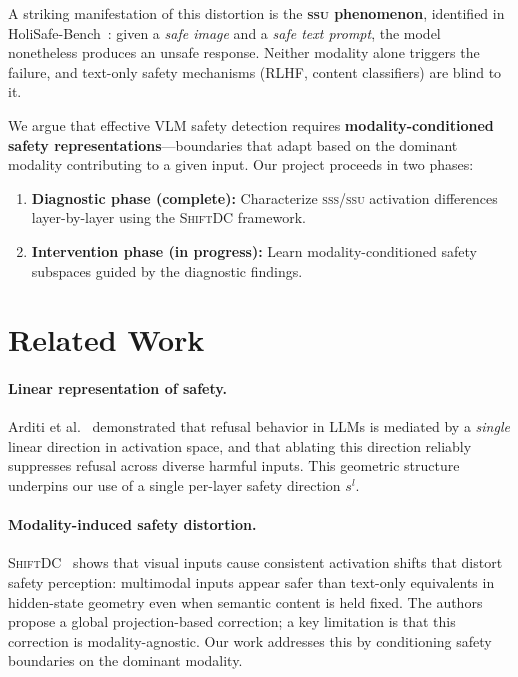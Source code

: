 \documentclass{article}
\newcommand{\ShiftDC}{\textsc{ShiftDC}}
\newcommand{\safel}{s^l}
\begin{document}
A striking manifestation of this distortion is the \textbf{\textsc{ssu} phenomenon},
identified in HoliSafe-Bench~\cite{lee2025holisafe}: given a \emph{safe image} and a
\emph{safe text prompt}, the model nonetheless produces an unsafe response.
Neither modality alone triggers the failure, and text-only safety mechanisms
(RLHF, content classifiers) are blind to it.

We argue that effective VLM safety detection requires \textbf{modality-conditioned safety
representations}---boundaries that adapt based on the dominant modality contributing to a
given input.
Our project proceeds in two phases:
\begin{enumerate}[noitemsep]
  \item \textbf{Diagnostic phase (complete):} Characterize \textsc{sss}/\textsc{ssu}
        activation differences layer-by-layer using the \ShiftDC{} framework.
  \item \textbf{Intervention phase (in progress):} Learn modality-conditioned safety
        subspaces guided by the diagnostic findings.
\end{enumerate}

\section{Related Work}

\paragraph{Linear representation of safety.}
Arditi et al.~\cite{arditi2024refusal} demonstrated that refusal behavior in LLMs is mediated
by a \emph{single} linear direction in activation space, and that ablating this direction
reliably suppresses refusal across diverse harmful inputs.
This geometric structure underpins our use of a single per-layer safety direction $\safel$.

\paragraph{Modality-induced safety distortion.}
\ShiftDC{}~\cite{zou2025shiftdc} shows that visual inputs cause consistent activation shifts
that distort safety perception: multimodal inputs appear safer than text-only equivalents in
hidden-state geometry even when semantic content is held fixed.
The authors propose a global projection-based correction; a key limitation is that this
correction is modality-agnostic.
Our work addresses this by conditioning safety boundaries on the dominant modality.
\end{document}
